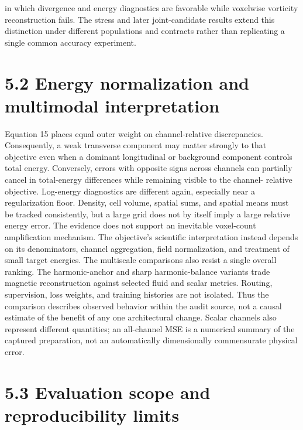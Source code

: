 \documentclass[11pt]{article}
\begin{document}
in which divergence and energy diagnostics are favorable while voxelwise vorticity reconstruction
fails. The stress and later joint-candidate results extend this distinction under different populations
and contracts rather than replicating a single common accuracy experiment.

\section*{5.2 Energy normalization and multimodal interpretation}

Equation 15 places equal outer weight on channel-relative discrepancies. Consequently, a weak
transverse component may matter strongly to that objective even when a dominant longitudinal
or background component controls total energy. Conversely, errors with opposite signs across
channels can partially cancel in total-energy differences while remaining visible to the channel-
relative objective. Log-energy diagnostics are different again, especially near a regularization floor.
Density, cell volume, spatial sums, and spatial means must be tracked consistently, but a large
grid does not by itself imply a large relative energy error. The evidence does not support an
inevitable voxel-count amplification mechanism. The objective’s scientific interpretation instead
depends on its denominators, channel aggregation, field normalization, and treatment of small
target energies.
The multiscale comparisons also resist a single overall ranking. The harmonic-anchor and sharp
harmonic-balance variants trade magnetic reconstruction against selected fluid and scalar metrics.
Routing, supervision, loss weights, and training histories are not isolated. Thus the comparison
describes observed behavior within the audit source, not a causal estimate of the benefit of any one
architectural change. Scalar channels also represent different quantities; an all-channel MSE is a
numerical summary of the captured preparation, not an automatically dimensionally commensurate
physical error.

\section*{5.3 Evaluation scope and reproducibility limits}
\end{document}
